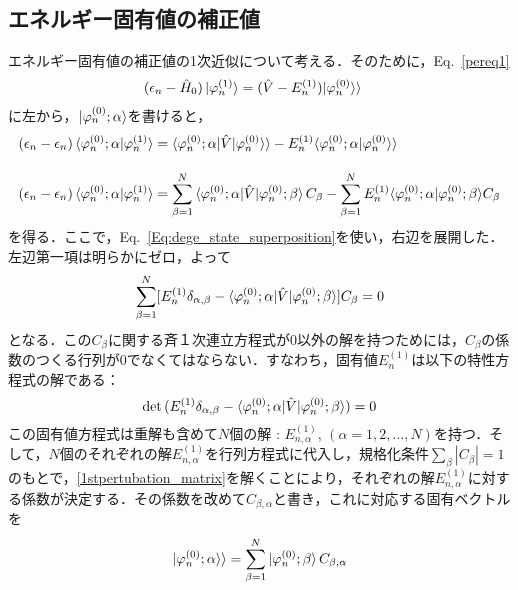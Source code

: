 \subsection{エネルギー固有値の補正値}
エネルギー固有値の補正値の1次近似について考える．そのために，Eq.~\eqref{pereq1}
\begin{align}
(
\epsilon_n-\hat{H}_0)\ket{\varphi^{(1)}_n}
&=(\hat{V}-E^{(1)}_n)|\varphi^{(0)}_n\rangle\rangle
\end{align}
に左から，$\ket{\varphi^{(0)}_n;\alpha}$を書けると，
\begin{align}\label{pereq1-1_degenerate}
(\epsilon_n-\epsilon_n)\braket{\varphi^{(0)}_n;\alpha|\varphi^{(1)}_n}
&=\langle{\varphi^{(0)}_n;\alpha|\hat{V}|\varphi^{(0)}_n}\rangle\rangle-E^{(1)}_n
\langle \varphi^{(0)}_n;\alpha|\varphi^{(0)}_n\rangle\rangle\\[10pt]
%
(\epsilon_n-\epsilon_n)\braket{\varphi^{(0)}_n;\alpha|\varphi^{(1)}_n}
&=\sum_{\beta=1}^{N}\braket{\varphi^{(0)}_n;\alpha|\hat{V}|\varphi^{(0)}_n;\beta}C_{\beta}
-\sum_{\beta=1}^{N}E^{(1)}_n
\langle \varphi^{(0)}_n;\alpha|\varphi^{(0)}_n;\beta\rangle C_\beta
\end{align}
を得る．ここで，Eq.~\eqref{Eq:dege_state_superposition}を使い，右辺を展開した．左辺第一項は明らかにゼロ，よって
\begin{align}\label{1stpertubation_matrix}
\sum_{\beta=1}^{N}[
E^{(1)}_n \delta_{\alpha,\beta}
-\braket{\varphi^{(0)}_n;\alpha|\hat{V}|\varphi^{(0)}_n;\beta}
]C_\beta=0
\end{align}
となる．この$C_{\beta}$に関する斉１次連立方程式が0以外の解を持つためには，$C_{\beta}$の係数のつくる行列が0でなくてはならない．すなわち，固有値$E^{(1)}_{n}$は以下の特性方程式の解である：
\begin{equation}\label{1st_eigen_eq}
    \det{(E^{(1)}_n \delta_{\alpha,\beta}
    -\braket{\varphi^{(0)}_n;\alpha|\hat{V}|\varphi^{(0)}_n;\beta})}=0
\end{equation}
この固有値方程式は重解も含めて$N$個の解 : $E^{(1)}_{n,\alpha}$, $(\alpha=1,2,\ldots,N)$を持つ．そして，$N$個のそれぞれの解$E^{(1)}_{n,\alpha}$を行列方程式に代入し，規格化条件$\sum_{\beta}|C_{\beta}|=1$のもとで，\eqref{1stpertubation_matrix}を解くことにより，それぞれの解$E^{(1)}_{n,\alpha}$に対する係数が決定する．その係数を改めて$C_{\beta,\alpha}$と書き，これに対応する固有ベクトルを
\begin{equation}
    |\varphi^{(0)}_{n};\alpha\rangle\rangle
    =\sum_{\beta=1}^{N}
    \ket{\varphi^{(0)}_{n};\beta}C_{\beta,\alpha}
\end{equation}
